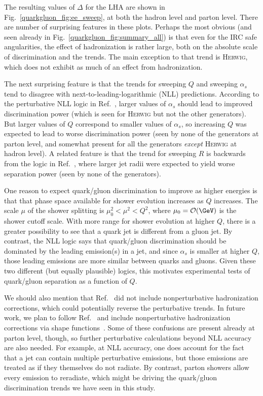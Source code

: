 \documentclass[11pt]{cernrep}
\begin{document}
The resulting values of $\Delta$ for the LHA are shown in Fig.~\ref{quarkgluon_fig:ee_sweep}, at both the hadron level and parton level.   There are number of surprising features in these plots.  Perhaps the most obvious (and seen already in Fig.~\ref{quarkgluon_fig:summary_all}) is that even for the IRC safe angularities, the effect of hadronization is rather large, both on the absolute scale of discrimination and the trends.  The main exception to that trend is \textsc{Herwig}, which does not exhibit as much of an effect from hadronization.

The next surprising feature is that the trends for sweeping $Q$ and sweeping $\alpha_s$ tend to disagree with next-to-leading-logarithmic (NLL) predictions.  According to the  perturbative NLL logic in Ref.~\cite{Larkoski:2013eya}, larger values of $\alpha_s$ should lead to improved discrimination power (which is seen for \textsc{Herwig} but not the other generators).  But larger values of $Q$ correspond to smaller values of $\alpha_s$, so increasing $Q$ was expected to lead to worse discrimination power (seen by none of the generators at parton level, and somewhat present for all the generators \emph{except} \textsc{Herwig} at hadron level).  A related feature is that the trend for sweeping $R$ is backwards from the logic in Ref.~\cite{Larkoski:2013eya}, where larger jet radii were expected to yield worse separation power (seen by none of the generators).

One reason to expect quark/gluon discrimination to improve as higher energies is that that phase space available for shower evolution increases as $Q$ increases.  The scale $\mu$ of the shower splitting is $\mu_0^2 < \mu^2 < Q^2$, where $\mu_0 = \mathcal{O}(\GeV)$ is the shower cutoff scale.  With more range for shower evolution at higher $Q$, there is a greater possibility to see that a quark jet is different from a gluon jet.  By contrast, the NLL logic says that quark/gluon discrimination should be dominated by the leading emission(s) in a jet, and since $\alpha_s$ is smaller at higher $Q$, those leading emissions are more similar between quarks and gluons.  Given these two different (but equally plausible) logics, this motivates experimental tests of quark/gluon separation as a function of $Q$.

We should also mention that Ref.~\cite{Larkoski:2013eya} did not include nonperturbative hadronization corrections, which could potentially reverse the perturbative trends.  In future work, we plan to follow Ref.~\cite{Larkoski:2013paa} and include nonperturbative hadronization corrections via shape functions~\cite{Manohar:1994kq, Dokshitzer:1995zt, Korchemsky:1999kt, Korchemsky:2000kp, Salam:2001bd, Lee:2006nr, Mateu:2012nk}.  Some of these confusions are present already at parton level, though, so further perturbative calculations beyond NLL accuracy are also needed.  For example, at NLL accuracy, one does account for the fact that a jet can contain multiple perturbative emissions, but those emissions are treated as if they themselves do not radiate.  By contrast, parton showers allow every emission to reradiate, which might be driving the quark/gluon discrimination trends we have seen in this study.
\end{document}
